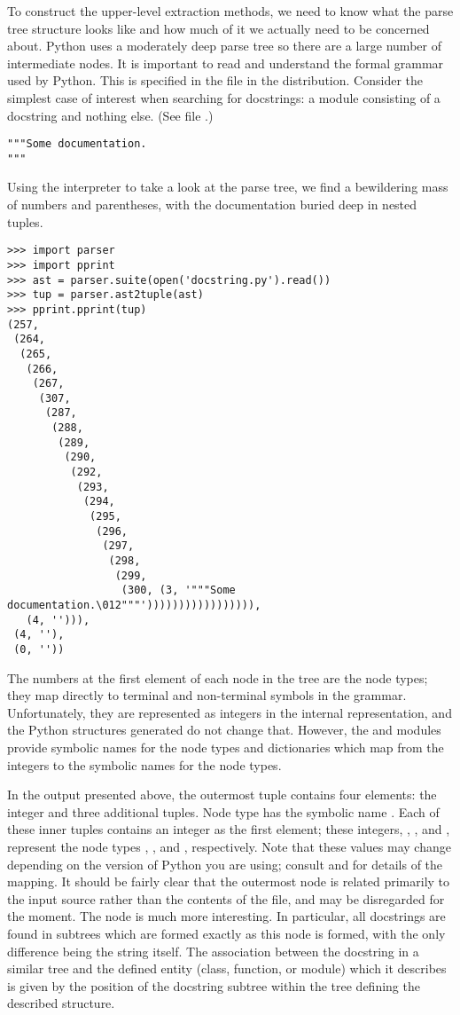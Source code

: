 To construct the upper-level extraction methods, we need to know what
the parse tree structure looks like and how much of it we actually
need to be concerned about.  Python uses a moderately deep parse tree
so there are a large number of intermediate nodes.  It is important to
read and understand the formal grammar used by Python.  This is
specified in the file  in the distribution.
Consider the simplest case of interest when searching for docstrings:
a module consisting of a docstring and nothing else.  (See file
.)

\begin{verbatim}
"""Some documentation.
"""
\end{verbatim}

Using the interpreter to take a look at the parse tree, we find a
bewildering mass of numbers and parentheses, with the documentation
buried deep in nested tuples.

\begin{verbatim}
>>> import parser
>>> import pprint
>>> ast = parser.suite(open('docstring.py').read())
>>> tup = parser.ast2tuple(ast)
>>> pprint.pprint(tup)
(257,
 (264,
  (265,
   (266,
    (267,
     (307,
      (287,
       (288,
        (289,
         (290,
          (292,
           (293,
            (294,
             (295,
              (296,
               (297,
                (298,
                 (299,
                  (300, (3, '"""Some documentation.\012"""'))))))))))))))))),
   (4, ''))),
 (4, ''),
 (0, ''))
\end{verbatim}

The numbers at the first element of each node in the tree are the node
types; they map directly to terminal and non-terminal symbols in the
grammar.  Unfortunately, they are represented as integers in the
internal representation, and the Python structures generated do not
change that.  However, the  and  modules
provide symbolic names for the node types and dictionaries which map
from the integers to the symbolic names for the node types.

In the output presented above, the outermost tuple contains four
elements: the integer  and three additional tuples.  Node
type  has the symbolic name .  Each of
these inner tuples contains an integer as the first element; these
integers, , , and , represent the node types
, , and ,
respectively.
Note that these values may change depending on the version of Python
you are using; consult  and  for
details of the mapping.  It should be fairly clear that the outermost
node is related primarily to the input source rather than the contents
of the file, and may be disregarded for the moment.  The 
node is much more interesting.  In particular, all docstrings are
found in subtrees which are formed exactly as this node is formed,
with the only difference being the string itself.  The association
between the docstring in a similar tree and the defined entity (class,
function, or module) which it describes is given by the position of
the docstring subtree within the tree defining the described
structure.

